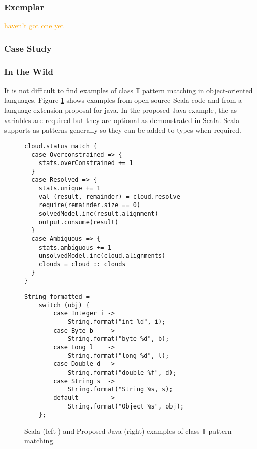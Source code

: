 \documentclass[acmsmall]{acmart}
\renewcommand\todo[1]{\textcolor{orange}{#1}}
\begin{document}
\subsubsection{Exemplar}

\todo{haven't got one yet}


\subsubsection{Case Study}

\subsubsection{In the Wild}
It is not difficult to find examples of class $\mathbb{T}$ pattern matching in object-oriented languages.  Figure \ref{lst:wild_t} shows examples from open source Scala code and from a language extension proposal\cite{Bierman18} for java.  In the proposed Java example, the as variables are required but they are optional as demonstrated in  Scala.  Scala supports as patterns generally so they can be added to types when required.

\begin{figure}
\hspace{-4em}
\begin{minipage}[t]{0.45\linewidth}
\begin{lstlisting}[basicstyle=\small\ttfamily]
cloud.status match {
  case Overconstrained => {
    stats.overConstrained += 1
  }
  case Resolved => {
    stats.unique += 1
    val (result, remainder) = cloud.resolve
    require(remainder.size == 0)
    solvedModel.inc(result.alignment)
    output.consume(result)
  }
  case Ambiguous => {
    stats.ambiguous += 1
    unsolvedModel.inc(cloud.alignments)
    clouds = cloud :: clouds
  }
}
\end{lstlisting}
\end{minipage}
\hspace{2em}
\begin{minipage}[t]{0.45\linewidth}
\begin{lstlisting}[basicstyle=\small\ttfamily]
String formatted =
    switch (obj) {
        case Integer i -> 
            String.format("int %d", i); 
        case Byte b    -> 
            String.format("byte %d", b); 
        case Long l    -> 
            String.format("long %d", l); 
        case Double d  -> 
            String.format("double %f", d); 
        case String s  -> 
            String.format("String %s, s);
        default        -> 
            String.format("Object %s", obj);
    };
\end{lstlisting}
\end{minipage}
\caption{Scala (left \cite{larsyencken10}) and Proposed Java (right) examples of class $\mathbb{T}$ pattern matching.}
\label{lst:wild_t}
\end{figure}
\end{document}
